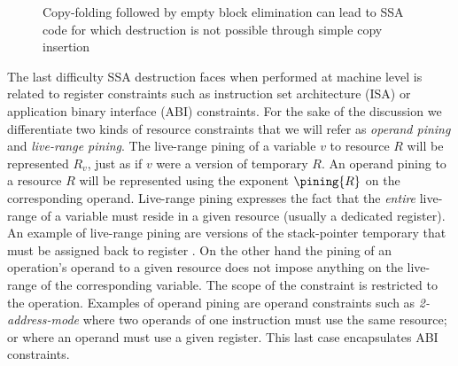 \begin{figure}[h]
\hfill
{}\hfill
{}\caption{\label{fig:alternative_ssa_destruction:doublepreds} Copy-folding followed by empty block elimination can lead to SSA code for which destruction is not possible through simple copy insertion}
\end{figure}


The last difficulty SSA destruction faces when performed at machine level is related to register constraints such as instruction set architecture (ISA) or application binary interface (ABI) constraints. 
For the sake of the discussion we differentiate two kinds of resource constraints that we will refer as \emph{operand pining} and \emph{live-range pining}. 
The live-range pining of a variable $v$ to resource $R$ will be represented $R_v$, just as if $v$ were a version of temporary $R$. 
An operand pining to a resource $R$ will be represented using the exponent $\pining{R}$ on the corresponding operand. 
Live-range pining expresses the fact that the \emph{entire} live-range of a variable must reside in a given resource (usually a dedicated register). 
An example of live-range pining are versions of the stack-pointer temporary that must be assigned back to register \SP. 
On the other hand the pining of an operation's operand to a given resource does not impose anything on the live-range of the corresponding variable. 
The scope of the constraint is restricted to the operation. 
Examples of operand pining are operand constraints such as \emph{2-address-mode} where two operands of one instruction must use the same resource; 
or where an operand must use a given register. 
This last case encapsulates ABI constraints.

